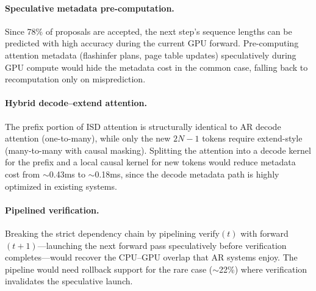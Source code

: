 \paragraph{Speculative metadata pre-computation.}
Since 78\% of proposals are accepted, the next step's sequence lengths can be predicted with high accuracy during the current GPU forward. Pre-computing attention metadata (flashinfer plans, page table updates) speculatively during GPU compute would hide the metadata cost in the common case, falling back to recomputation only on misprediction.

\paragraph{Hybrid decode--extend attention.}
The prefix portion of ISD attention is structurally identical to AR decode attention (one-to-many), while only the new $2N{-}1$ tokens require extend-style (many-to-many with causal masking). Splitting the attention into a decode kernel for the prefix and a local causal kernel for new tokens would reduce metadata cost from ${\sim}$0.43ms to ${\sim}$0.18ms, since the decode metadata path is highly optimized in existing systems.

\paragraph{Pipelined verification.}
Breaking the strict dependency chain by pipelining verify$(t)$ with forward$(t{+}1)$---launching the next forward pass speculatively before verification completes---would recover the CPU--GPU overlap that AR systems enjoy. The pipeline would need rollback support for the rare case (${\sim}$22\%) where verification invalidates the speculative launch.
